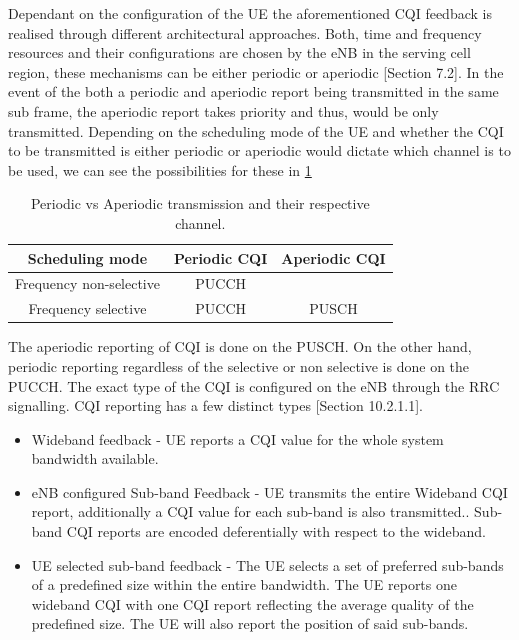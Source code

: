 \documentclass{article}
\begin{document}
Dependant on the configuration of the UE the aforementioned CQI feedback is realised through different architectural approaches. Both, time and frequency resources and their configurations are chosen by the eNB in the serving cell region, these mechanisms can be either periodic or aperiodic \cite{ETSITS136213}[Section 7.2]. In the event of the both a periodic and aperiodic report being transmitted in the same sub frame, the aperiodic report takes priority and thus, would be only transmitted.  Depending on the scheduling mode of the UE and whether the CQI to be transmitted is either periodic or aperiodic would dictate which channel is to be used, we can see the possibilities for these in \cref{tab:cqi_aperiod_sel}
\begin{table}[H]
        \centering
     \begin{tabular}{||c c c||} 
     \hline
     Scheduling mode & Periodic CQI & Aperiodic CQI  \\ [0.1ex] 
     \hline\hline
     Frequency non-selective & PUCCH &  \\ 
     \hline
     Frequency selective  & PUCCH & PUSCH\\
     \hline
    \end{tabular}
    \caption{Periodic vs Aperiodic transmission and their respective channel.}
    \label{tab:cqi_aperiod_sel}
\end{table}
The aperiodic reporting of CQI is done on the PUSCH. On the other hand, periodic reporting regardless of the selective or non selective is done on the PUCCH. The exact type of the CQI is configured on the eNB through the RRC signalling. CQI reporting has a few distinct types \cite{umts_sesia}[Section 10.2.1.1]. 
\begin{itemize}
    \item Wideband feedback - UE reports a CQI value for the whole system bandwidth available.
    \item eNB configured Sub-band Feedback - UE transmits the entire Wideband CQI report, additionally a CQI value for each sub-band is also transmitted.. Sub-band CQI reports are encoded deferentially with respect to the wideband.
    \item UE selected sub-band feedback - The UE selects a set of preferred sub-bands of a predefined size within the entire bandwidth.  The UE reports one wideband CQI with one CQI report reflecting the average quality of the predefined size. The UE will also report the position of said sub-bands.
    
\end{itemize}
\end{document}
